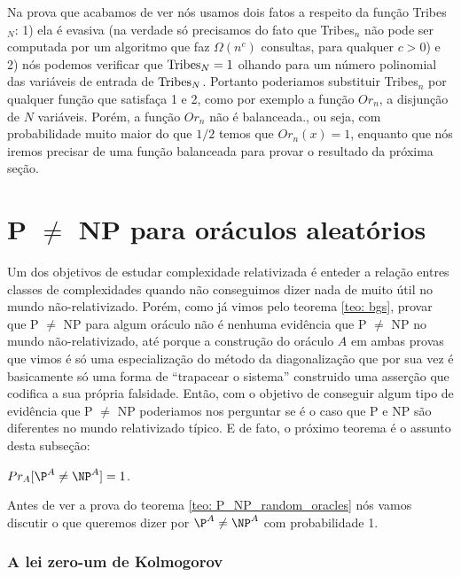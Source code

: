 Na prova que acabamos de ver nós usamos dois fatos a respeito da função Tribes$_{N}$: 1) ela é evasiva (na verdade só precisamos do fato que Tribes$_{n}$ não pode ser computada por um algoritmo que faz $\Omega(n^{c})$ consultas, para qualquer $c > 0$) e 2) nós podemos verificar que $\text{Tribes}_{N} = 1$ olhando para um número polinomial das variáveis de entrada de $\text{Tribes}_{N}$. Portanto poderiamos substituir Tribes$_{n}$ por qualquer função que satisfaça 1 e 2, como por exemplo a função $Or_{n}$, a disjunção de $N$ variáveis. Porém, a função $Or_{n}$ não é balanceada., ou seja, com probabilidade muito maior do que $1/2$ temos que $Or_{n}(x) = 1$, enquanto que nós iremos precisar de uma função balanceada para provar o resultado da próxima seção.

\section{P $\neq$ NP para oráculos aleatórios} \label{section_p_neq_np_random_oracles}

Um dos objetivos de estudar complexidade relativizada é enteder a relação entres classes de complexidades quando não conseguimos dizer nada de muito útil no mundo não-relativizado. Porém, como já vimos pelo teorema \ref{teo: bgs}, provar que P $\neq$ NP para algum oráculo não é nenhuma evidência que P $\neq$ NP no mundo não-relativizado, até porque a construção do oráculo $A$ em ambas provas que vimos é só uma especialização do método da diagonalização que por sua vez é basicamente só uma forma de ``trapacear o sistema'' construido uma asserção que codifica a sua própria falsidade. Então, com o objetivo de conseguir algum tipo de evidência que P $\neq$ NP poderiamos nos perguntar se é o caso que P e NP são diferentes no mundo relativizado típico. E de fato, o próximo teorema é o assunto desta subseção:

\begin{teo} \label{teo: P_NP_random_oracles}

$Pr_{A}[\P^{A} \neq \NP^{A}] = 1$.

\end{teo}

Antes de ver a prova do teorema \ref{teo: P_NP_random_oracles} nós vamos discutir o que queremos dizer por $\P^{A} \neq \NP^{A}$ com probabilidade 1.

\subsubsection{A lei zero-um de Kolmogorov}

